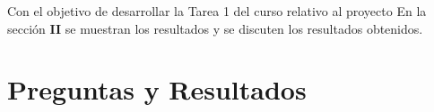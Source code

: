 \documentclass[preprintnumbers,superscriptaddress,amsmath,%
  amssymb,aps,reprint,nofootinbib]{revtex4-1}
\numberwithin{equation}{section}
\begin{document}




 



\noindent 
Con el objetivo de desarrollar la Tarea 1 del curso relativo al proyecto 
\medskip
En la sección \textbf{II} se muestran los resultados y se discuten los resultados obtenidos.




\section{Preguntas y Resultados}

\\
 
 
\end{document}
